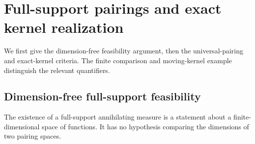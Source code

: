 \documentclass[11pt]{amsart}
\theoremstyle{definition}\newtheorem{definition}[theorem]{Definition}
\theoremstyle{remark}\newtheorem{remark}[theorem]{Remark}
\begin{document}
\endgroup
\section{Full-support pairings and exact kernel realization}
\label{app:pairings}
We first give the dimension-free feasibility argument, then the
universal-pairing and exact-kernel criteria. The finite comparison and
moving-kernel example distinguish the relevant quantifiers.
\begingroup
\let\section\subsection
\let\subsection\subsubsection
\let\subsubsection\paragraph
\section{Dimension-free full-support feasibility}
\label{sec:kernel-feasibility}
The existence of a full-support annihilating measure is a statement
about a finite-dimensional space of functions. It has no hypothesis
comparing the dimensions of two pairing spaces.
\end{document}

